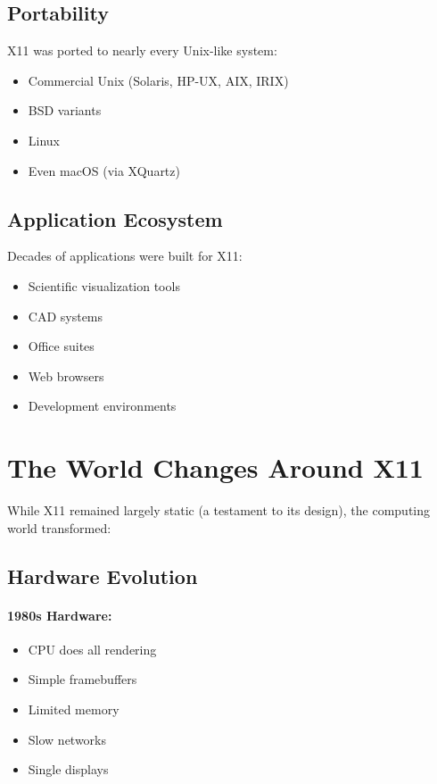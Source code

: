 \subsection{Portability}

X11 was ported to nearly every Unix-like system:
\begin{itemize}[leftmargin=*]
    \item Commercial Unix (Solaris, HP-UX, AIX, IRIX)
    \item BSD variants
    \item Linux
    \item Even macOS (via XQuartz)
\end{itemize}

\subsection{Application Ecosystem}

Decades of applications were built for X11:
\begin{itemize}[leftmargin=*]
    \item Scientific visualization tools
    \item CAD systems
    \item Office suites
    \item Web browsers
    \item Development environments
\end{itemize}

\section{The World Changes Around X11}

While X11 remained largely static (a testament to its design), the computing world transformed:

\subsection{Hardware Evolution}

\paragraph{1980s Hardware:}
\begin{itemize}[leftmargin=*]
    \item CPU does all rendering
    \item Simple framebuffers
    \item Limited memory
    \item Slow networks
    \item Single displays
\end{itemize}

